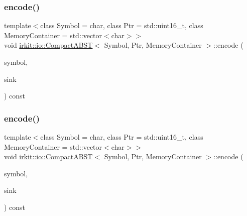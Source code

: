 \mbox{\label{classirkit_1_1io_1_1CompactABST_aa4d1008e712a1fb8e95baa924cc70e50}} 
\subsubsection{\texorpdfstring{encode()}{encode()}\hspace{0.1cm}{\footnotesize\ttfamily [1/3]}}
{\footnotesize\ttfamily template$<$class Symbol = char, class Ptr = std\+::uint16\+\_\+t, class Memory\+Container = std\+::vector$<$char$>$$>$ \\
void \mbox{\hyperlink{classirkit_1_1io_1_1CompactABST}{irkit\+::io\+::\+Compact\+A\+B\+ST}}$<$ Symbol, Ptr, Memory\+Container $>$\+::encode (\begin{DoxyParamCaption}\item[{Symbol}]{symbol,  }\item[{\mbox{\hyperlink{classirkit_1_1io_1_1OutputBitStream}{Output\+Bit\+Stream}} \&}]{sink }\end{DoxyParamCaption}) const\hspace{0.3cm}{\ttfamily [inline]}}

\mbox{\label{classirkit_1_1io_1_1CompactABST_a204d3d71ef1f0816570b2a2b705b268a}} 
\subsubsection{\texorpdfstring{encode()}{encode()}\hspace{0.1cm}{\footnotesize\ttfamily [2/3]}}
{\footnotesize\ttfamily template$<$class Symbol = char, class Ptr = std\+::uint16\+\_\+t, class Memory\+Container = std\+::vector$<$char$>$$>$ \\
void \mbox{\hyperlink{classirkit_1_1io_1_1CompactABST}{irkit\+::io\+::\+Compact\+A\+B\+ST}}$<$ Symbol, Ptr, Memory\+Container $>$\+::encode (\begin{DoxyParamCaption}\item[{Symbol}]{symbol,  }\item[{boost\+::dynamic\+\_\+bitset$<$ unsigned char $>$ \&}]{sink }\end{DoxyParamCaption}) const\hspace{0.3cm}{\ttfamily [inline]}}

